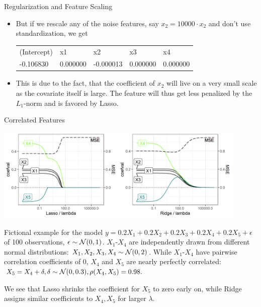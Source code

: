 \documentclass[11pt,compress,t,notes=noshow, xcolor=table]{beamer}
\begin{document}
\begin{vbframe}{Regularization and Feature Scaling}
\begin{itemize}
\normalsize
\item But if we rescale any of the noise features, say $x_2 = 10000 \cdot x_2$ and don't use standardization, we get
\footnotesize
\vspace{0.2cm}

\begin{table}[]
\begin{tabular}{lllll}
(Intercept) & x1       & x2        & x3       & x4       \\
-0.106830   & 0.000000 & -0.000013 & 0.000000 & 0.000000         
\end{tabular}
\end{table}

\normalsize

\item This is due to the fact, that the coefficient of $x_2$ will live on a very small scale as the covariate itself is large. The feature will thus get less penalized by the $L_1$-norm and is favored by Lasso.
\end{itemize}

\end{vbframe}

\begin{vbframe}{Correlated Features}


\includegraphics[width=0.9\textwidth]{figure/regu_example_multicollinearity.png}

Fictional example for the model $y = 0.2X_1 + 0.2X_2 + 0.2X_3 + 0.2X_4 + 0.2X_5 + \epsilon$ of 100 observations, $\epsilon \sim \mathcal{N} (0,1)$. $X_1$-$X_4$ are independently drawn from different normal distributions: $X_1, X_2, X_3, X_4 \sim \mathcal{N} (0,2)$. While $X_1$-$X_4$ have pairwise correlation coefficients of 0, $X_4$ and $X_5$ are nearly perfectly correlated: $X_5 = X_4 + \delta, \delta \sim \mathcal{N} (0,0.3), \rho(X_4, X_5) = 0.98. $

\vspace{0.1cm}

We see that Lasso shrinks the coefficient for $X_5$ to zero early on, while Ridge assigns similar coefficients to $X_4, X_5$ for larger $\lambda$.

\end{vbframe}
\end{document}
